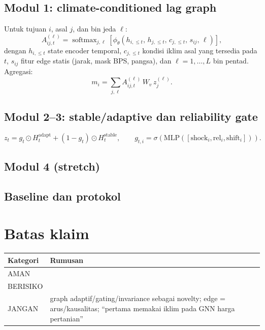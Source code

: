 \documentclass[11pt,a4paper]{article}
\begin{document}
\subsection{Modul 1: climate-conditioned lag graph}
Untuk tujuan $i$, asal $j$, dan bin jeda $\ell$:
\begin{equation}
A^{(\ell)}_{ij,t}
= \operatorname{softmax}_{j,\ell}
\left[
\phi_\theta\left(h_{i,\le t},\, h_{j,\le t},\, c_{j,\le t},\, s_{ij},\, \ell\right)
\right],
\label{eq:module1}
\end{equation}
dengan $h_{i,\le t}$ state encoder temporal, $c_{j,\le t}$ kondisi iklim asal yang
tersedia pada $t$, $s_{ij}$ fitur edge statis (jarak, mask BPS, pangsa), dan
$\ell=1,\dots,L$ bin pentad. Agregasi:
\begin{equation}
m_i = \sum_{j,\ell} A^{(\ell)}_{ij,t}\, W_v\, z_j^{(\ell)}.
\end{equation}

\subsection{Modul 2--3: stable/adaptive dan reliability gate}
\begin{equation}
z_t = g_t \odot H^{\mathrm{adapt}}_t + (1-g_t)\odot H^{\mathrm{stable}}_t,
\qquad
g_{t,i} = \sigma\left(\mathrm{MLP}([\text{shock}_i,\text{rel}_i,\text{shift}_i])\right).
\end{equation}

\subsection{Modul 4 (stretch)}

\subsection{Baseline dan protokol}

\section{Batas klaim}
\begin{table}[H]
\centering
\small
\begin{tabular}{@{}L{2.4cm}L{11.8cm}@{}}
\toprule
Kategori & Rumusan \\
\midrule
AMAN &  \\
BERISIKO &  \\
JANGAN & graph adaptif/gating/invariance sebagai novelty; edge = arus/kausalitas;
``pertama memakai iklim pada GNN harga pertanian'' \\
\bottomrule
\end{tabular}
\end{table}
\end{document}
